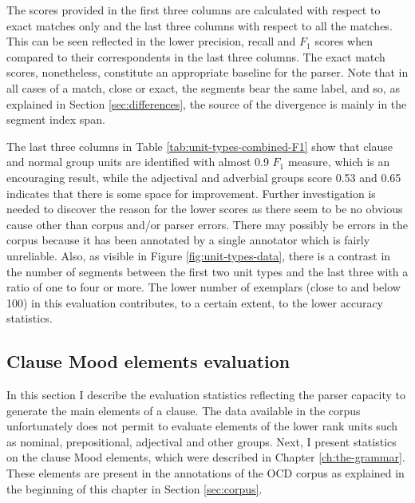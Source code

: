     The scores provided in the first three columns are calculated with respect to exact matches only and the last three columns with respect to all the matches. This can be seen reflected in the lower precision, recall and $F_1$ scores when compared to their correspondents in the last three columns. The exact match scores, nonetheless, constitute an appropriate baseline for the parser. Note that in all cases of a match, close or exact, the segments bear the same label, and so, as explained in Section \ref{sec:differences}, the source of the divergence is mainly in the segment index span. 
    
    The last three columns in Table \ref{tab:unit-types-combined-F1} show that clause and normal group units are identified with almost 0.9 $F_1$ measure, which is an encouraging result, while the adjectival and adverbial groups score 0.53 and 0.65 indicates that there is some space for improvement. 
    Further investigation is needed to discover the reason for the lower scores as there seem to be no obvious cause other than corpus and/or parser errors. There may possibly be errors in the corpus because it has been annotated by a single annotator which is fairly unreliable. Also, as visible in Figure \ref{fig:unit-types-data}, there is a contrast in the number of segments between the first two unit types and the last three with a ratio of one to four or more. The lower number of exemplars (close to and below 100) in this evaluation contributes, to a certain extent, to the lower accuracy statistics.
    
\subsection{Clause Mood elements evaluation}
\label{sec:unit-mood-element-evaluation}

    In this section I describe the evaluation statistics reflecting the parser capacity to generate the main elements of a clause. The data available in the corpus unfortunately does not permit to evaluate elements of the lower rank units such as nominal, prepositional, adjectival and other groups. Next, I present statistics on the clause Mood elements, which were described in Chapter \ref{ch:the-grammar}. These elements are present in the annotations of the OCD corpus as explained in the beginning of this chapter in Section \ref{sec:corpus}. 
    
